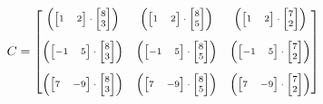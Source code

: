 \documentclass[handout]{beamer}
\numberwithin{equation}{section}
\begin{document}
\begin{frame}
\pause \begin{align*}\scriptsize
C =  \begin{bmatrix}
\left ( \begin{bmatrix} 1 & 2\end{bmatrix} \cdot \begin{bmatrix} 8 \\ 3\end{bmatrix}  \right ) & \left (  \begin{bmatrix} 1 & 2 \end{bmatrix} \cdot \begin{bmatrix} 8 \\ 5 \end{bmatrix}  \right ) & \left ( \begin{bmatrix} 1 & 2 \end{bmatrix} \cdot \begin{bmatrix} 7 \\ 2\end{bmatrix} \right ) \\ \\
\left ( \begin{bmatrix} -1 & 5\end{bmatrix} \cdot \begin{bmatrix} 8 \\ 3 \end{bmatrix}  \right) & \left (  \begin{bmatrix} -1 & 5 \end{bmatrix} \cdot \begin{bmatrix} 8 \\ 5 \end{bmatrix} \right ) & \left (\begin{bmatrix} -1 & 5 \end{bmatrix} \cdot \begin{bmatrix} 7 \\ 2\end{bmatrix} \right )\\ \\
\left ( \begin{bmatrix} 7 & -9 \end{bmatrix} \cdot \begin{bmatrix} 8 \\ 3 \end{bmatrix}  \right) & \left (  \begin{bmatrix}  7 & -9\end{bmatrix} \cdot \begin{bmatrix} 8 \\ 5 \end{bmatrix} \right ) & \left (\begin{bmatrix} 7 & -9 \end{bmatrix} \cdot \begin{bmatrix} 7 \\ 2\end{bmatrix} \right )\\
\end{bmatrix}
\end{align*}
\end{frame}
\end{document}
